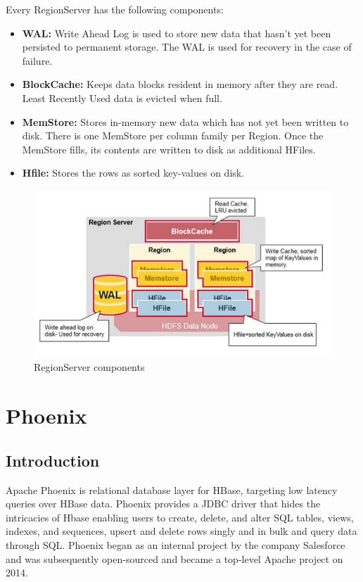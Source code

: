 Every RegionServer has the following components:
\begin{itemize}
\item \textbf{WAL:} Write Ahead Log is used to store new data that hasn't yet been persisted to permanent storage. The WAL is used for recovery in the case of failure.
\item \textbf{BlockCache:} Keeps data blocks resident in memory after they are read. Least Recently Used data is evicted when full.
\item \textbf{MemStore:} Stores in-memory new data which has not yet been written to disk. There is one MemStore per column family per Region. Once the MemStore fills, its contents are written to disk as additional HFiles.
\item \textbf{Hfile:} Stores the rows as sorted key-values on disk.
\end{itemize}

\begin{figure}[H]
\centering
\includegraphics{figures/hbase_regionserver_components}
\caption{RegionServer components}
\label{figure:hbase_regionserver_components}
\end{figure}

\section{Phoenix}
\subsection{Introduction}

Apache Phoenix is relational database layer for HBase, targeting low latency queries over HBase data. Phoenix provides a JDBC driver that hides the intricacies of Hbase enabling users to create, delete, and alter SQL tables, views, indexes, and sequences, upsert and delete rows singly and in bulk and query data through SQL. Phoenix began as an internal project by the company Salesforce and was subsequently open-sourced and became a top-level Apache project on 2014.

